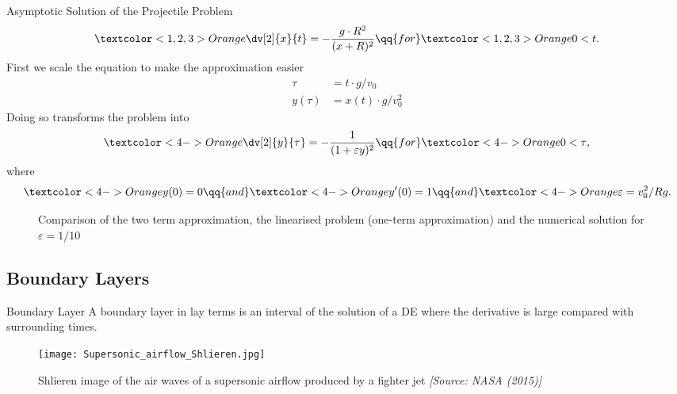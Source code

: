 \begin{frame}{Asymptotic Solution of the Projectile Problem}
    \[
        \textcolor<1,2,3>{Orange}{\dv[2]{x}{t} = - \frac{g \cdot R^2}{(x + R)^2}} \qq{for} \textcolor<1,2,3>{Orange}{0 < t}.
    \]  \pause First we scale the equation to make the approximation easier \pause
    \begin{align*}
        \tau &= t \cdot g / v_0 \\
        y(\tau) &= x(t) \cdot g / v_0^2
    \end{align*} \pause Doing so transforms the problem into 
    \[
        \textcolor<4->{Orange}{\dv[2]{y}{\tau} = - \frac{1}{(1 + \varepsilon y)^2}} \qq{for} \textcolor<4->{Orange}{0 < \tau},
    \] where \[
        \textcolor<4->{Orange}{y(0) = 0} \qq{and} \textcolor<4->{Orange}{y'(0) = 1} \qq{and} \textcolor<4->{Orange}{\varepsilon = v_0^2 / Rg}.
    \] 
\end{frame}

\begin{frame}
    \begin{figure}[h!]
      \centering
      \caption{Comparison of the two term approximation, the linearised problem (one-term approximation) and the
      numerical solution for \(\varepsilon = 1/10\)} 
    \end{figure}
\end{frame}

\subsection{Boundary Layers}%
\label{sub:boundary_layers}
\begin{frame}{Boundary Layer}
  A boundary layer in lay terms is an interval of the solution of a DE where the derivative is large compared with
  surrounding times.
\end{frame}

\begin{frame}
  \begin{figure}
    \centering
    \texttt{[image: Supersonic\_airflow\_Shlieren.jpg]}
    \caption{Shlieren image of the air waves of a supersonic airflow produced by a fighter jet \emph{[Source: NASA (2015)]}}
  \end{figure}
\end{frame}



